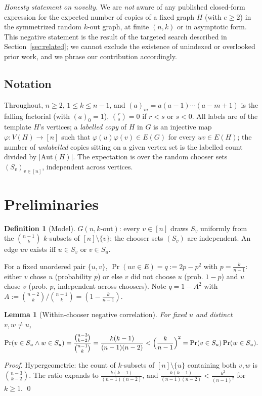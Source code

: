 \documentclass[11pt,a4paper]{article}
\newtheorem{lemma}[theorem]{Lemma}
\theoremstyle{definition}
\theoremstyle{definition}
\newtheorem*{definition*}{Definition}
\begin{document}
\emph{Honesty statement on novelty.} We are \emph{not} aware of any published
closed-form expression for the expected number of copies of a fixed graph
$H$ (with $e\ge2$) in the symmetrized random $k$-out graph, at finite $(n,k)$ or in
asymptotic form. This negative statement is the result of the targeted search
described in Section~\ref{sec:related}; we cannot exclude the existence of
unindexed or overlooked prior work, and we phrase our contribution accordingly.

\subsection{Notation}
Throughout, $n\ge 2$, $1\le k\le n-1$, and $(a)_m = a(a-1)\cdots(a-m+1)$ is the
falling factorial (with $(a)_0=1$), $\binom{r}{s}=0$ if $r<s$ or $s<0$. All labels
are of the template $H$'s vertices; a \emph{labelled copy} of $H$ in $G$ is an
injective map $\varphi:V(H)\to[n]$ such that $\varphi(u)\varphi(v)\in E(G)$ for every
$uv\in E(H)$; the number of \emph{unlabelled} copies sitting on a given vertex set is
the labelled count divided by $|\mathrm{Aut}(H)|$. The expectation is over the
random chooser sets $(S_v)_{v\in[n]}$, independent across vertices.

\section{Preliminaries}\label{sec:model}

\begin{definition*}[Model]
$G(n,k\text{-out})$: every $v\in[n]$ draws $S_v$ uniformly from the
$\binom{n-1}{k}$ $k$-subsets of $[n]\setminus\{v\}$; the chooser sets
$(S_v)$ are independent. An edge $uv$ exists iff $u\in S_v$ or $v\in S_u$.
\end{definition*}

For a fixed unordered pair $\{u,v\}$, $\Pr(uv\in E) = q := 2p-p^{2}$ with
$p=\tfrac{k}{n-1}$: either $v$ chose $u$ (probability $p$) or else $v$ did not choose
$u$ (prob. $1-p$) and $u$ chose $v$ (prob. $p$, independent across choosers).
Note $q=1-A^{2}$ with $A:=\binom{n-2}{k}/\binom{n-1}{k}=(1-\tfrac{k}{n-1})$.

\begin{lemma}[Within-chooser negative correlation]\label{lem:negcorr}
For fixed $u$ and distinct $v,w\ne u$,
\[
\Pr(v\in S_u \wedge w \in S_u) = \frac{\binom{n-3}{k-2}}{\binom{n-1}{k}}
=\frac{k(k-1)}{(n-1)(n-2)} < \Bigl(\frac{k}{n-1}\Bigr)^{2} = \Pr(v\in S_u)\Pr(w\in S_u).
\]
\end{lemma}
\begin{proof}
Hypergeometric: the count of $k$-subsets of $[n]\setminus\{u\}$ containing both
$v,w$ is $\binom{n-3}{k-2}$. The ratio expands to $\frac{k(k-1)}{(n-1)(n-2)}$, and
$\frac{k(k-1)}{(n-1)(n-2)}<\frac{k^2}{(n-1)^2}$ for $k\ge1$. \qed
\end{proof}
\end{document}
